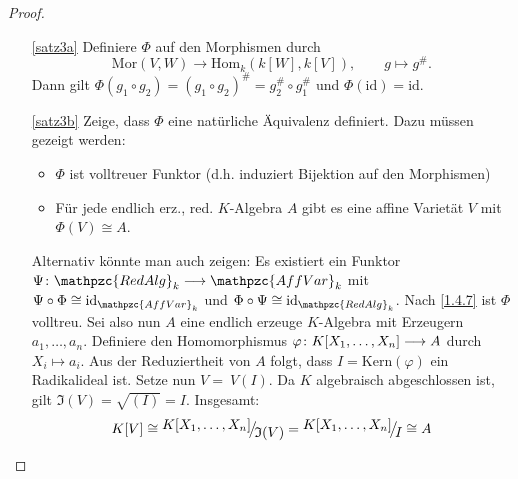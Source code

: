 \documentclass[a4paper,12pt]{scrbook}
\newtheorem{proof}{Beweis}
\def\I{\mathfrak{I}}
\newcommand{\AffVar}{\mathpzc{AffVar}}
\newcommand{\RedAlg}{\mathpzc{RedAlg}}
\newcommand{\Hom}{\mathrm{Hom}}
\newcommand{\Mor}{\mathrm{Mor}}
\newcommand{\Kern}{\mathrm{Kern}}
\newcommand{\id}{\mathrm{id}}
\newcommand{\ra}{\longrightarrow}
\renewcommand{\phi}{\varphi}
\renewcommand{\mapsto}{\longmapsto}
\newcommand{\Quotient}[2]{
  \raisebox{0.7ex}{\ensuremath{#1}}
  \ensuremath{\mkern-3mu}\big/\ensuremath{\mkern-3mu}
  \raisebox{-0.6ex}{\ensuremath{#2}}}
\newcommand{\polyx}[1][n]{\ensuremath%
  [X_{1},\dotsc,X_{#1}]}
\begin{document}
\begin{proof}
\begin{enumerate}
\item[\ref{satz3a}] Definiere $\Phi$ auf den Morphismen durch 
\[\Mor(V,W)\ra \Hom_k(k[W],k[V]), \qquad g\mapsto g^{\#}.\]
Dann gilt $\Phi(g_1\circ g_2)=(g_1\circ g_2)^{\#}=g_2^\#\circ g_1^\#$ und $\Phi(\id)=\id$.
\item[\ref{satz3b}] Zeige, dass $\Phi$ eine natürliche Äquivalenz definiert. Dazu müssen gezeigt werden: 
\begin{itemize}
\item $\Phi$ ist volltreuer Funktor (d.h. induziert Bijektion auf den Morphismen)
\item Für jede endlich erz., red. $K$-Algebra $A$ gibt es eine affine Varietät $V$ mit $\Phi(V)\cong A$. 
\end{itemize}
Alternativ könnte man auch zeigen: Es existiert ein Funktor $\Psi\colon  \RedAlg_k\ra \AffVar_k$ mit $\Psi\circ \Phi\cong \id_{\AffVar_k}$ und $\Phi\circ \Psi\cong \id_{\RedAlg_k}$.
Nach \cref{1.4.7} ist $\Phi$ volltreu. Sei also nun $A$ eine endlich erzeuge $K$-Algebra mit Erzeugern $a_1,\dotsc,a_n$.
Definiere den Homomorphismus $\phi\colon  K\polyx\ra A$ durch $X_i\mapsto a_i$. Aus der Reduziertheit von $A$ folgt, dass
$I=\Kern(\phi)$ ein Radikalideal ist. Setze nun $V=\ V(I)$. Da $K$ algebraisch abgeschlossen ist, gilt $\I(V)=\sqrt{(I)}=I$. Insgesamt:
\[K[V]\cong\Quotient{K\polyx}{\I(V)}=\Quotient{K\polyx}{I}\cong A\] 
\end{enumerate}
\end{proof}
\end{document}
